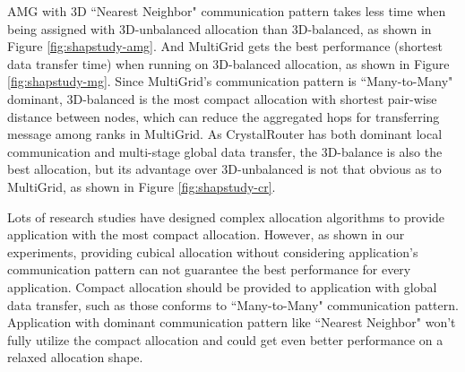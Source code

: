AMG with 3D ``Nearest Neighbor" communication pattern takes less time when being assigned with 3D-unbalanced allocation than 3D-balanced, as shown in Figure \ref{fig:shapstudy-amg}. And MultiGrid gets the best performance (shortest data transfer time) when running on 3D-balanced allocation, as shown in Figure \ref{fig:shapstudy-mg}. Since MultiGrid's communication pattern is ``Many-to-Many" dominant, 3D-balanced is the most compact allocation with shortest pair-wise distance between nodes, which can reduce the aggregated hops for transferring message among ranks in MultiGrid. As CrystalRouter has both dominant local communication and multi-stage global data transfer, the 3D-balance is also the best allocation, but its advantage over 3D-unbalanced is not that obvious as to MultiGrid, as shown in Figure \ref{fig:shapstudy-cr}.

Lots of research studies have designed complex allocation algorithms to provide application with the most compact allocation\cite{leung,LO}. However, as shown in our experiments, providing cubical allocation without considering application's communication pattern can not guarantee the best performance for every application. Compact allocation should be provided to application with global data transfer, such as those conforms to ``Many-to-Many" communication pattern. Application with dominant communication pattern like ``Nearest Neighbor" won't fully utilize the compact allocation and could get even better performance on a relaxed allocation shape. 



